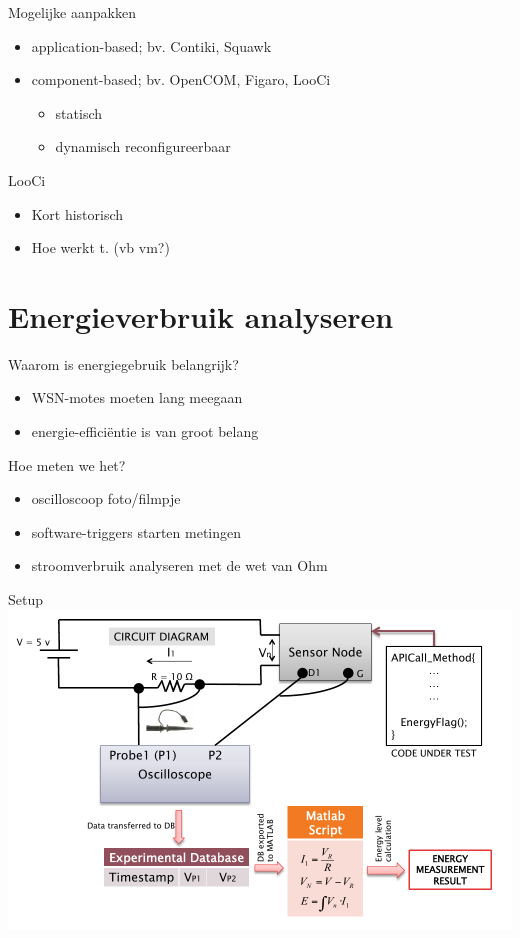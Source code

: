 \documentclass[presentation, bigger]{beamer}
\begin{document}
\begin{frame}[label=sec-2-2]{Mogelijke aanpakken}
\begin{itemize}
\item application-based; bv. Contiki, Squawk
\item component-based; bv. OpenCOM, Figaro, LooCi
\begin{itemize}
\item statisch
\item dynamisch reconfigureerbaar
\end{itemize}
\end{itemize}
\end{frame}

\begin{frame}[label=sec-2-3]{LooCi}
\begin{itemize}
\item Kort historisch
\item Hoe werkt t. (vb vm?)
\end{itemize}
\end{frame}
\section{Energieverbruik analyseren}
\label{sec-3}

\begin{frame}[label=sec-3-1]{Waarom is energiegebruik belangrijk?}
\begin{itemize}
\item WSN-motes moeten lang meegaan
\item energie-efficiëntie is van groot belang
\end{itemize}
\end{frame}

\begin{frame}[label=sec-3-2]{Hoe meten we het?}
\begin{itemize}
\item oscilloscoop
foto/filmpje
\item software-triggers starten metingen
\item stroomverbruik analyseren met de wet van Ohm
\end{itemize}
\end{frame}

\begin{frame}[label=sec-3-3]{Setup}
\includegraphics[width=\textwidth,keepaspectration=true]{energy_measurement_diagram}
\end{frame}
\end{document}
